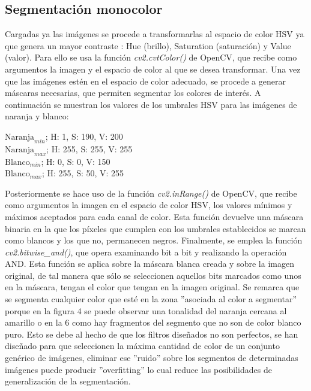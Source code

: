 \documentclass[a4paper,12pt]{article}
\begin{document}
{\subsection{Segmentación monocolor}

\vspace{0.5cm}

Cargadas ya las imágenes se procede a transformarlas al espacio de color HSV ya que genera un mayor contraste : Hue (brillo), Saturation (saturación) y Value (valor).
Para ello se usa la función \textit{cv2.cvtColor()} de OpenCV, que recibe como argumentos la imagen y el espacio de color al que se desea transformar. Una vez que las 
imágenes estén en el espacio de color adecuado, se procede a generar máscaras necesarias, que permiten segmentar los colores de interés. A continuación se muestran los
valores de los umbrales HSV para las imágenes de naranja y blanco:

\vspace{0.5cm}

{\centering
$\text{Naranja}_{min}$; H: 1, S: 190, V: 200 \\
$\text{Naranja}_{max}$; H: 255, S: 255, V: 255 \\
$\text{Blanco}_{min}$; H: 0, S: 0, V: 150 \\
$\text{Blanco}_{max}$; H: 255, S: 50, V: 255 \\
}

\vspace{0.5cm}

Posteriormente se hace uso de la función \textit{cv2.inRange()} de OpenCV, que recibe como argumentos la imagen en el espacio de color HSV, los valores mínimos y máximos 
aceptados para cada canal de color. Esta función devuelve una máscara binaria en la que los píxeles que cumplen con los umbrales establecidos se marcan como blancos y 
los que no, permanecen negros. Finalmente, se emplea la función \textit{cv2.bitwise\_and()}, que opera examinando bit a bit y realizando la operación AND. Esta función se aplica 
sobre la máscara blanca creada y sobre la imagen original, de tal manera que sólo se seleccionen aquellos bits marcados como unos en la máscara, tengan el color que tengan 
en la imagen original. Se remarca que se segmenta cualquier color que esté en la zona ''asociada al color a segmentar'' porque en la figura 4 se puede observar una tonalidad 
del naranja cercana al amarillo o en la 6 como hay fragmentos del segmento que no son de color blanco puro. Esto se debe al hecho de que los filtros diseñados no son perfectos,
se han diseñado para que seleccionen la máxima cantidad de color de un conjunto genérico de imágenes, eliminar ese ''ruido'' sobre los segmentos de determinadas imágenes puede 
producir ''overfitting'' lo cual reduce las posibilidades de generalización de la segmentación.

}
\end{document}
